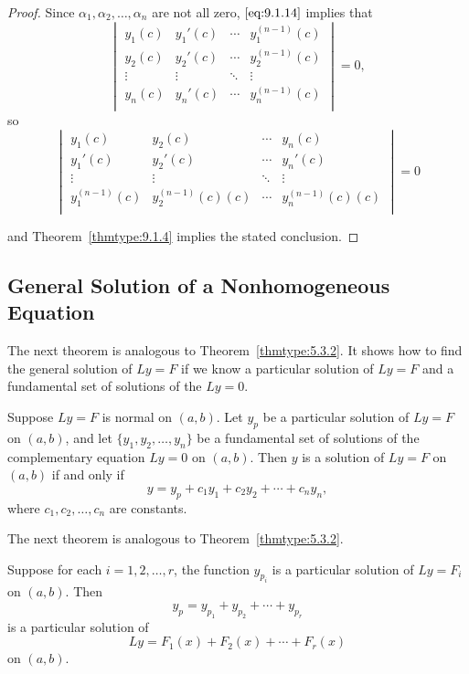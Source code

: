 \documentclass{ximera}
\begin{document}
\begin{proof} Since $\alpha_{1}, \alpha_{2}, \dots, \alpha_{n}$
are not all zero,
$\eqref{eq:9.1.14}$ implies that
$$
\begin{vmatrix}
y_{1}(c)&y_{1}'(c)&\cdots&y_{1}^{(n-1)}(c)\\
y_{2}(c)&y_{2}'(c)&\cdots&y_{2}^{(n-1)}(c)\\
\vdots&\vdots&\ddots&\vdots\\
y_{n}(c)&y_{n}'(c)&\cdots&y_{n}^{(n-1)}(c)\\
\end{vmatrix}=0,
$$
so
$$
\begin{vmatrix}
y_{1}(c)&y_{2}(c)&\cdots& y_{n}(c)\\
y_{1}'(c)&y_{2}'(c)&\cdots& y_{n}'(c)\\
\vdots&\vdots&\ddots&\vdots\\
y_{1}^{(n-1)}(c)&y_{2}^{(n-1)}(c)(c)&\cdots& y_{n}^{(n-1)}(c)(c)\\
\end{vmatrix}=0
$$

and Theorem~\ref{thmtype:9.1.4} implies the stated conclusion.
\end{proof}




\subsection*{General Solution of a Nonhomogeneous Equation}

The next theorem is analogous to
Theorem~\ref{thmtype:5.3.2}.
It shows how to find the general solution of $Ly=F$ if we know a particular
solution of $Ly=F$ and a fundamental set of solutions of the  $Ly=0$.

\begin{theorem}\label{thmtype:9.1.6}
Suppose $Ly=F$ is normal on $(a,b)$. Let $y_p$ be a particular
solution of $Ly=F$ on $(a,b)$, and let $\{y_1,y_2,\dots,y_n\}$ be a
fundamental set of solutions of the complementary equation $Ly=0$ on
$(a,b)$. Then $y$ is a solution of $Ly=F$ on $(a,b)$ if and only if
$$
y=y_p+c_1y_1+c_2y_2+\cdots+c_ny_n,
$$
where $c_1,c_2,\dots,c_n$  are constants.
\end{theorem}

The next theorem is analogous to Theorem~\ref{thmtype:5.3.2}.

\begin{theorem}\label{thmtype:9.1.7}
Suppose for each $i=1, 2, \dots, r$, the function $y_{p_i}$ is a
particular solution of $Ly=F_i$ on  $(a,b)$. Then
$$
y_p=y_{p_1}+y_{p_2}+\cdots+y_{p_r}
$$
is a particular  solution of
$$
Ly=F_1(x)+F_2(x)+\cdots+F_r(x)
$$
on $(a,b)$.
\end{theorem}
\end{document}

